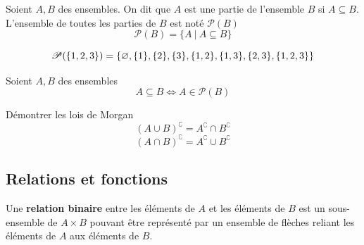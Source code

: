  
\begin{center}
\end{center}

    \begin{definition}
        Soient $A,B$ des ensembles. On dit que $A$ est une partie de l'ensemble $B$ si $A\subseteq B$. L'ensemble de toutes les parties de $B$ est noté $\mathcal{P}(B)$
        \[
        \mathcal{P}(B)=\{A \: |\: A\subseteq B\}
        \]
    \end{definition}
\begin{exemple}
    \[
\mathscr{P}(\{1,2,3\})= \{ \varnothing, \{1\}, \{2\}, \{3\}, \{1,2\}, \{1,3\}, \{2,3\}, \{1,2,3\} \}
\]
\end{exemple}

\begin{remarque}
    Soient $A,B$ des ensembles
    \[
    A\subseteq B \Leftrightarrow A\in \mathcal{P}(B)
    \]
\end{remarque}
\begin{exercice}
Démontrer les lois de Morgan
\[
(A \cup B)^{\complement} = A^{\complement}\cap B^{\complement}
\]
\[
(A \cap B)^{\complement} = A^{\complement} \cup B^{\complement}
\]
\end{exercice}


\subsection{Relations et fonctions}



\begin{definition} 
Une \textbf{relation binaire} entre les éléments de \( A \) et les éléments de \( B \) est un sous-ensemble de \( A \times B \) pouvant être représenté par un ensemble de flèches reliant les éléments de \( A \) aux éléments de \( B \).  
\end{definition}



